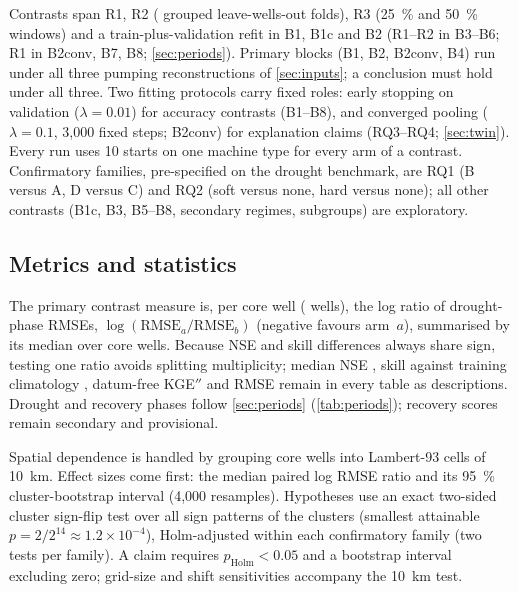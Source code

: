 Contrasts span R1, R2 (\nDataFolds{} grouped leave-wells-out folds), R3 (\SI{25}{\percent} and
\SI{50}{\percent} windows) and a train-plus-validation refit in B1, B1c and B2 (R1--R2 in B3--B6;
R1 in B2conv, B7, B8; \cref{sec:periods}). Primary blocks (B1, B2, B2conv, B4) run under all three
pumping reconstructions of \cref{sec:inputs}; a conclusion must hold under all three. Two fitting
protocols carry fixed roles: early stopping on validation ($\lambda = 0.01$) for accuracy contrasts
(B1--B8), and converged pooling ($\lambda = 0.1$, 3,000 fixed steps; B2conv) for explanation claims
(RQ3--RQ4; \cref{sec:twin}). Every run uses 10 starts on one machine type for every arm of a
contrast. Confirmatory families, pre-specified on the drought benchmark, are RQ1 (B versus A, D
versus C) and RQ2 (soft versus none, hard versus none); all other contrasts (B1c, B3, B5--B8,
secondary regimes, subgroups) are exploratory.

\subsection{Metrics and statistics}\label{sec:metrics}

The primary contrast measure is, per core well (\nDataCoreWells{} wells), the log ratio of
drought-phase RMSEs, $\log(\mathrm{RMSE}_a / \mathrm{RMSE}_b)$ (negative favours arm~$a$),
summarised by its median over core wells. Because NSE and skill differences always share sign,
testing one ratio avoids splitting multiplicity; median NSE \citep{Nash1970River}, skill against
training climatology \citep{Schaefli2007Do}, datum-free KGE$''$ \citep{Tang2021Sc} and RMSE remain
in every table as descriptions. Drought and recovery phases follow \cref{sec:periods}
(\cref{tab:periods}); recovery scores remain secondary and provisional.

Spatial dependence is handled by grouping core wells into \baselineClusterCount{} Lambert-93 cells
of \SI{10}{km}. Effect sizes come first: the median paired log RMSE ratio and its \SI{95}{\percent}
cluster-bootstrap interval (4,000 resamples). Hypotheses use an exact two-sided cluster sign-flip
test over all sign patterns of the \baselineClusterCount{} clusters (smallest attainable $p = 2/2^{14} \approx 1.2\times10^{-4}$),
Holm-adjusted within each confirmatory family (two tests per family). A claim requires
$p_{\mathrm{Holm}} < 0.05$ and a bootstrap interval excluding zero; grid-size and shift
sensitivities accompany the \SI{10}{km} test.

